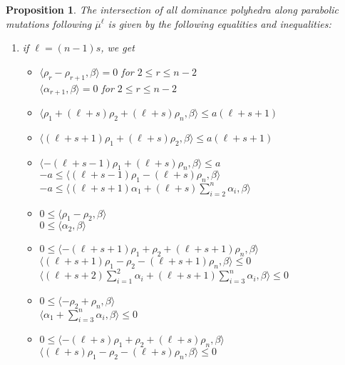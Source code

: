 \documentclass{amsart}
\newtheorem{proposition}[theorem]{Proposition}
\numberwithin{theorem}{section}
\begin{document}
  \begin{proposition}
    The intersection of all dominance polyhedra along parabolic mutations following $\overline{\mu}^\ell$ is given by the following equalities and inequalities:
    \begin{enumerate}
      \item if $\ell=(n-1)s$, we get 
        \begin{itemize}
          \item $\langle \rho_r-\rho_{r+1}, \beta\rangle = 0$ for $2\le r\le n-2$\\
            $\langle \alpha_{r+1}, \beta\rangle = 0$ for $2\le r\le n-2$\\
          \item $\langle \rho_1+(\ell+s)\rho_2+(\ell+s)\rho_n, \beta\rangle \le a(\ell+s+1)$
          \item $\langle (\ell+s+1)\rho_1+(\ell+s)\rho_2, \beta\rangle \le a(\ell+s+1)$\\
          \item $\langle -(\ell+s-1)\rho_1+(\ell+s)\rho_n, \beta\rangle \le a$\\
            $-a \le \langle (\ell+s-1)\rho_1-(\ell+s)\rho_n, \beta\rangle$\\
            $-a \le \langle (\ell+s+1)\alpha_1+(\ell+s)\sum_{i=2}^n\alpha_i, \beta\rangle$\\
          \item $0 \le \langle \rho_1-\rho_2, \beta\rangle$\\
            $0 \le \langle \alpha_2, \beta\rangle$\\
          \item $0 \le \langle -(\ell+s+1)\rho_1+\rho_2+(\ell+s+1)\rho_n, \beta\rangle$\\
            $\langle (\ell+s+1)\rho_1-\rho_2-(\ell+s+1)\rho_n, \beta\rangle \le 0$\\
            $\langle (\ell+s+2)\sum_{i=1}^2\alpha_i+(\ell+s+1)\sum_{i=3}^n\alpha_i, \beta\rangle \le 0$\\
          \item $0 \le \langle -\rho_2+\rho_n, \beta\rangle$\\
            $\langle \alpha_1+\sum_{i=3}^n \alpha_i, \beta\rangle \le 0$\\
          \item $0 \le \langle -(\ell+s)\rho_1+\rho_2+(\ell+s)\rho_n, \beta\rangle$\\
            $\langle (\ell+s)\rho_1-\rho_2-(\ell+s)\rho_n, \beta\rangle \le 0$\\

\end{itemize}
\end{enumerate}
\end{proposition}
\end{document}
